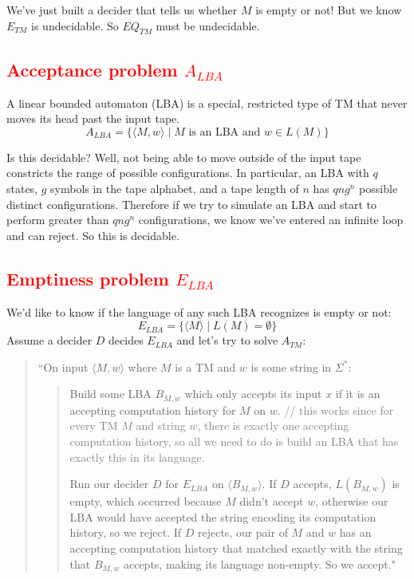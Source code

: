 \documentclass[11pt]{article}
\begin{document}
We've just built a decider that tells us whether $M$ is empty or not! But we know $E_{TM}$ is undecidable. So $EQ_{TM}$ must be undecidable.

\subsection{\textcolor{red}{Acceptance problem $A_{LBA}$}}
A linear bounded automaton (LBA) is a special, restricted type of TM that never moves its head past the input tape. 
\[A_{LBA} = \{\langle M, w \rangle \mid M \text{ is an LBA and } w \in L(M)\}\]

Is this decidable? Well, not being able to move outside of the input tape constricts the range of possible configurations. In particular, an LBA with $q$ states, $g$ symbols in the tape alphabet, and a tape length of $n$ has $qng^n$ possible distinct configurations. Therefore if we try to simulate an LBA and start to perform greater than $qng^n$ configurations, we know we've entered an infinite loop and can reject. So this is decidable.

\subsection{\textcolor{red}{Emptiness problem $E_{LBA}$}}
We'd like to know if the language of any such LBA recognizes is empty or not:
\[E_{LBA} = \{\langle M \rangle \mid L(M) = \emptyset\}\]
Assume a decider $D$ decides $E_{LBA}$ and let's try to solve $A_{TM}$:
\begin{quote}
``On input $\langle M, w \rangle$ where $M$ is a TM and $w$ is some string in $\Sigma^*$: 
\begin{quote}
Build some LBA $B_{M, w}$ which only accepts its input $x$ if it is an accepting computation history for $M$ on $w$. \textcolor{gray}{// this works since for every TM $M$ and string $w$, there is exactly one accepting computation history, so all we need to do is build an LBA that has exactly this in its language.}

Run our decider $D$ for $E_{LBA}$ on $\langle B_{M, w} \rangle$. If $D$ accepts, $L(B_{M, w})$ is empty, which occurred because $M$ didn't accept $w$, otherwise our LBA would have accepted the string encoding its computation history, so we reject. If $D$ rejects, our pair of $M$ and $w$ has an accepting computation history that matched exactly with the string that $B_{M, w}$ accepts, making its language non-empty. So we accept."
\end{quote}
\end{quote}
\end{document}

